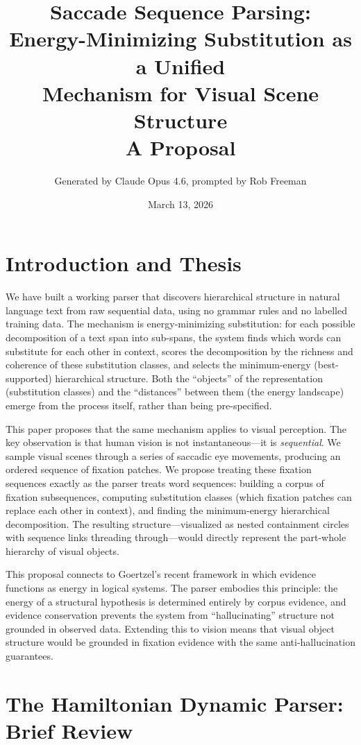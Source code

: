 \documentclass[11pt,a4paper]{article}
\title{\vspace{-2em}\textbf{Saccade Sequence Parsing:\\Energy-Minimizing Substitution as a Unified\\Mechanism for Visual Scene Structure}\\[0.5em]\large A Proposal}
\author{Generated by Claude Opus 4.6, prompted by Rob Freeman}
\date{March 13, 2026}
\begin{document}
\maketitle
\thispagestyle{empty}

\section{Introduction and Thesis}

We have built a working parser that discovers hierarchical structure in natural language text from raw sequential data, using no grammar rules and no labelled training data. The mechanism is energy-minimizing substitution: for each possible decomposition of a text span into sub-spans, the system finds which words can substitute for each other in context, scores the decomposition by the richness and coherence of these substitution classes, and selects the minimum-energy (best-supported) hierarchical structure. Both the ``objects'' of the representation (substitution classes) and the ``distances'' between them (the energy landscape) emerge from the process itself, rather than being pre-specified.

This paper proposes that the same mechanism applies to visual perception. The key observation is that human vision is not instantaneous---it is \textit{sequential}. We sample visual scenes through a series of saccadic eye movements, producing an ordered sequence of fixation patches. We propose treating these fixation sequences exactly as the parser treats word sequences: building a corpus of fixation subsequences, computing substitution classes (which fixation patches can replace each other in context), and finding the minimum-energy hierarchical decomposition. The resulting structure---visualized as nested containment circles with sequence links threading through---would directly represent the part-whole hierarchy of visual objects.

This proposal connects to Goertzel's recent framework in which evidence functions as energy in logical systems. The parser embodies this principle: the energy of a structural hypothesis is determined entirely by corpus evidence, and evidence conservation prevents the system from ``hallucinating'' structure not grounded in observed data. Extending this to vision means that visual object structure would be grounded in fixation evidence with the same anti-hallucination guarantees.

\section{The Hamiltonian Dynamic Parser: Brief Review}
\end{document}
